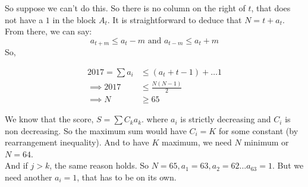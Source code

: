 \begin{solution}
    So suppose we can't do this. So there is no column on the right of $ t $,
    that does not have a $ 1 $ in the block $ A_t $. It is straightforward to
    deduce that $ N=t+a_t $. \\

    From there, we can say: \[a_{t+m}\le a_t-m\text{ and }a_{t-m}\le a_t+m\]
    So, 

    \begin{align*} 
        2017=\sum a_i &\le (a_t+t-1) +\dots 1 \\ 
        \implies 2017 &\le \frac{N(N-1)}{2}\\ 
        \implies N&\ge 65 
    \end{align*}

    We know that the score, $ S= \sum C_ka_k $. where $ a_i $ is strictly
    decreasing and $ C_i $ is non decreasing. So the maximum sum would have $
    C_i=K $ for some constant (by rearrangement inequality). And to have $ K $
    maximum, we need $ N $ minimum or $ N=64 $. \\

    And if $ j>k $, the same reason holds. So $ N=65, a_1=63, a_2=62\dots
    a_{63}=1 $. But we need another $ a_i=1 $, that has to be on its own.
\end{solution}

